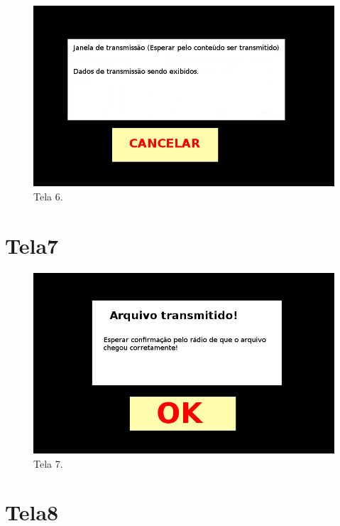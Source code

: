 \documentclass[11pt,a4paper]{article}
\begin{document}
\begin{figure}[H]
  \centering
  \hspace*{-1.5cm}
  \includegraphics[scale=0.7]{Tela6.png}
  \caption{Tela 6.}
  \label{Tela6}
\end{figure}

\section{Tela7}

\begin{figure}[H]
  \centering
  \hspace*{-1.5cm}
  \includegraphics[scale=0.7]{Tela7.png}
  \caption{Tela 7.}
  \label{Tela7}
\end{figure}

\section{Tela8}
\end{document}
